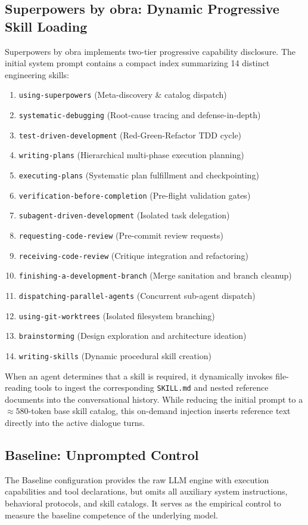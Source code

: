 \subsection{Superpowers by obra: Dynamic Progressive Skill Loading}
Superpowers by obra \cite{vincent2025superpowers} implements two-tier progressive capability disclosure. The initial system prompt contains a compact index summarizing 14 distinct engineering skills:
\begin{enumerate}
    \item \texttt{using-superpowers} (Meta-discovery \& catalog dispatch)
    \item \texttt{systematic-debugging} (Root-cause tracing and defense-in-depth)
    \item \texttt{test-driven-development} (Red-Green-Refactor TDD cycle)
    \item \texttt{writing-plans} (Hierarchical multi-phase execution planning)
    \item \texttt{executing-plans} (Systematic plan fulfillment and checkpointing)
    \item \texttt{verification-before-completion} (Pre-flight validation gates)
    \item \texttt{subagent-driven-development} (Isolated task delegation)
    \item \texttt{requesting-code-review} (Pre-commit review requests)
    \item \texttt{receiving-code-review} (Critique integration and refactoring)
    \item \texttt{finishing-a-development-branch} (Merge sanitation and branch cleanup)
    \item \texttt{dispatching-parallel-agents} (Concurrent sub-agent dispatch)
    \item \texttt{using-git-worktrees} (Isolated filesystem branching)
    \item \texttt{brainstorming} (Design exploration and architecture ideation)
    \item \texttt{writing-skills} (Dynamic procedural skill creation)
\end{enumerate}
When an agent determines that a skill is required, it dynamically invokes file-reading tools to ingest the corresponding \texttt{SKILL.md} and nested reference documents into the conversational history. While reducing the initial prompt to a $\approx 580$-token base skill catalog, this on-demand injection inserts reference text directly into the active dialogue turns.

\subsection{Baseline: Unprompted Control}
The Baseline configuration provides the raw LLM engine with execution capabilities and tool declarations, but omits all auxiliary system instructions, behavioral protocols, and skill catalogs. It serves as the empirical control to measure the baseline competence of the underlying model.

